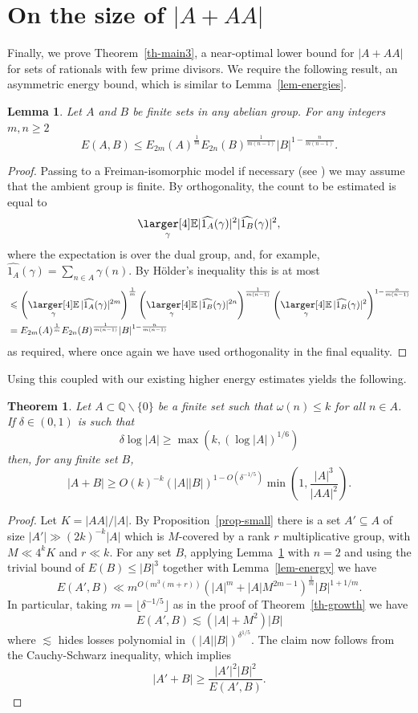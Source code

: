 \documentclass{amsart}
\renewcommand{\leq}{\leqslant}
\renewcommand{\geq}{\geqslant}
\newcommand{\bbq}{\mathbb{Q}}
\newcommand{\ls}{\lesssim}
\newcommand*{\bbe}{
  \mathop{
    \mathchoice{\vcenter{\hbox{\larger[4]$\mathbb{E}$}}}
               {\kern0pt\mathbb{E}}
               {\kern0pt\mathbb{E}}
               {\kern0pt\mathbb{E}}
  }\displaylimits
}
\newcommand{\abs}[1]{\left\lvert #1\right\rvert}
\newcommand{\Abs}[1]{\lvert #1\rvert}
\newcommand{\brac}[1]{\left( #1\right)}
\newtheorem{theorem}{Theorem}
\newtheorem{lemma}{Lemma}
\theoremstyle{definition}
\begin{document}
\section{On the size of $\abs{A+AA}$}
Finally, we prove Theorem~\ref{th-main3}, a near-optimal lower bound for $\abs{A+AA}$ for sets of rationals with few prime divisors. We require the following result, an asymmetric energy bound, which is similar to Lemma~\ref{lem-energies}.
\begin{lemma}\label{lem-energiesasymm}
Let $A$ and $B$ be finite sets in any abelian group. For any integers $m,n\geq 2$
\[E(A,B) \leq E_{2m}(A)^{\frac{1}{m}}E_{2n}(B)^{\frac{1}{m(n-1)}}\abs{B}^{1-\frac{n}{m(n-1)}}.\]
\end{lemma}
\begin{proof}
Passing to a Freiman-isomorphic model if necessary (see \cite[Chapter 5]{TaVu06}) we may assume that the ambient group is finite. By orthogonality, the count to be estimated is equal to
\[\bbe_{\gamma}  \Abs{\widehat{1_A}(\gamma)}^2\Abs{\widehat{1_B}(\gamma)}^2,\]
where the expectation is over the dual group, and, for example,  $\widehat{1_A}(\gamma)=\sum_{n\in A}\gamma(n)$. By H\"{o}lder's inequality this is at most
\begin{align*}
&\leq \left(\bbe_{\gamma}|\widehat{1_{A}}(\gamma)|^{2m}\right)^{\frac{1}{m}}\left(\bbe_{\gamma}|\widehat{1_{B}}(\gamma)|^{2n}\right)^{\frac{1}{m(n-1)}}\left(\bbe_{\gamma}|\widehat{1_{B}}(\gamma)|^2\right)^{1-\frac{n}{m(n-1)}}\\
            &=E_{2m}(A)^{\frac{1}{m}}E_{2n}(B)^{\frac{1}{m(n-1)}} |B|^{1-\frac{n}{m(n-1)}}
\end{align*}
as required, where once again we have used orthogonality in the final equality.  
\end{proof}

Using this coupled with our existing higher energy estimates yields the following.
\begin{theorem}
Let $A\subset \bbq\backslash\{0\}$ be a finite set such that $\omega(n)\leq k$ for all $n\in A$. If $\delta\in (0,1)$ is such that
\[\delta \log \abs{A} \geq \max(k,(\log \abs{A})^{1/6})\]
then, for any finite set $B$,
\[\abs{A+B}\geq O(k)^{-k}(\abs{A}\abs{B})^{1-O(\delta^{-1/5})}\min\brac{1, \frac{\abs{A}^3}{\abs{AA}^2}}.\]
\end{theorem}
\begin{proof}
Let $K=\abs{AA}/\abs{A}$. By Proposition~\ref{prop-small} there is a set $A'\subseteq A$ of size $\abs{A'}\gg (2k)^{-k}\abs{A}$ which is $M$-covered by a rank $r$ multiplicative group, with $M\ll 4^kK$ and $r\ll k$. For any set $B$, applying Lemma~\ref{lem-energiesasymm} with $n=2$ and using the trivial bound of $E(B)\leq \abs{B}^3$ together with Lemma~\ref{lem-energy} we have
\[E(A',B)\ll m^{O(m^3(m+r))}\brac{\abs{A}^m+\abs{A}M^{2m-1}}^{\frac{1}{m}}\abs{B}^{1+1/m}.\]
In particular, taking $m=\lfloor \delta^{-1/5}\rfloor$ as in the proof of Theorem~\ref{th-growth} we have
\[E(A',B)\ls (\abs{A}+M^2)\abs{B}\]
where $\ls$ hides losses polynomial in $(\abs{A}\abs{B})^{\delta^{1/5}}$. The claim now follows from the Cauchy-Schwarz inequality, which implies
\[\abs{A'+B}\geq \frac{\abs{A'}^2\abs{B}^2}{E(A',B)}.\]
\end{proof}
\end{document}
